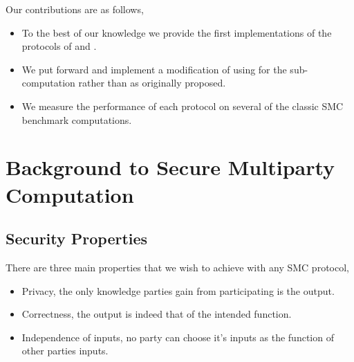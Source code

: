 \documentclass[ %
                    author={Nicholas Tutte},
                supervisor={Prof. Nigel Smart},
                    degree={MEng},
                     title={Secure Two Party Computation},
                  subtitle={A practical comparison of recent protocols},
                      type={Research - GG1K},
                      year={2015} ]{dissertation}
\begin{document}

		Our contributions are as follows,

		\begin{itemize}
			\item To the best of our knowledge we provide the first implementations of the protocols of \cite{LindellAndPinkas2011} and \cite{Lindell_CnC_2013}.%
			\item We put forward and implement a modification of \cite{Lindell_CnC_2013} using \cite{Katz_Symm_CnC_2013} for the sub-computation rather than \cite{LindellAndPinkas2011} as originally proposed.
			\item We measure the performance of each protocol on several of the classic SMC benchmark computations.
		\end{itemize}




	\chapter{Background to Secure Multiparty Computation} \label{sec:BG_toSMC}
		\section{Security Properties} \label{sub:SecurityProperties}
			There are three main properties that we wish to achieve with any SMC protocol,
			\begin{itemize}
				\item Privacy, the only knowledge parties gain from participating is the output.
				\item Correctness, the output is indeed that of the intended function.
				\item Independence of inputs, no party can choose it's inputs as the function of other parties inputs.
			\end{itemize}
\end{document}
